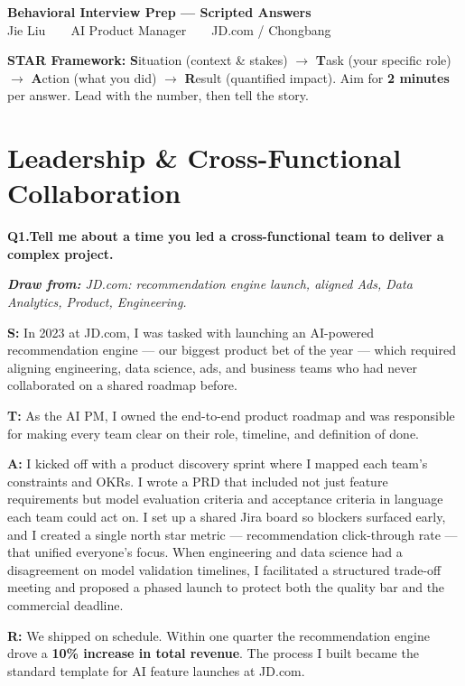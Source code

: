 \documentclass[10pt, letterpaper]{article}
\newcommand{\q}[2]{%
    \smallskip
    \noindent\textbf{\small Q#1.}\quad\textbf{#2}
    \vspace{3pt}
}
\newcommand{\hint}[1]{%
    \begin{notebox}
    \footnotesize\textit{\textbf{Draw from:} #1}
    \end{notebox}
}
\newcommand{\s}[1]{\textbf{\textcolor{starlabel}{S:}} #1}
\newcommand{\ta}[1]{\textbf{\textcolor{starlabel}{T:}} #1}
\newcommand{\ac}[1]{\textbf{\textcolor{starlabel}{A:}} #1}
\newcommand{\res}[1]{\textbf{\textcolor{starlabel}{R:}} #1}
\begin{document}
\begin{center}
    {\Large\bfseries\color{primary} Behavioral Interview Prep --- Scripted Answers}\\[2pt]
    {\small\color{accent} Jie Liu\ \ \textbar\ \ AI Product Manager\ \ \textbar\ \ JD.com / Chongbang}
\end{center}

\vspace{-2pt}
\begin{notebox}
\footnotesize\textbf{STAR Framework:} \textbf{S}ituation (context \& stakes) $\to$ \textbf{T}ask (your specific role) $\to$ \textbf{A}ction (what you did) $\to$ \textbf{R}esult (quantified impact). Aim for \textbf{2 minutes} per answer. Lead with the number, then tell the story.
\end{notebox}

\section{Leadership \& Cross-Functional Collaboration}

\q{1}{Tell me about a time you led a cross-functional team to deliver a complex project.}
\hint{JD.com: recommendation engine launch, aligned Ads, Data Analytics, Product, Engineering.}

\begin{answerbox}
\footnotesize
\s{In 2023 at JD.com, I was tasked with launching an AI-powered recommendation engine --- our biggest product bet of the year --- which required aligning engineering, data science, ads, and business teams who had never collaborated on a shared roadmap before.}

\medskip
\ta{As the AI PM, I owned the end-to-end product roadmap and was responsible for making every team clear on their role, timeline, and definition of done.}

\medskip
\ac{I kicked off with a product discovery sprint where I mapped each team's constraints and OKRs. I wrote a PRD that included not just feature requirements but model evaluation criteria and acceptance criteria in language each team could act on. I set up a shared Jira board so blockers surfaced early, and I created a single north star metric --- recommendation click-through rate --- that unified everyone's focus. When engineering and data science had a disagreement on model validation timelines, I facilitated a structured trade-off meeting and proposed a phased launch to protect both the quality bar and the commercial deadline.}

\medskip
\res{We shipped on schedule. Within one quarter the recommendation engine drove a \textbf{10\% increase in total revenue}. The process I built became the standard template for AI feature launches at JD.com.}
\end{answerbox}
\end{document}
